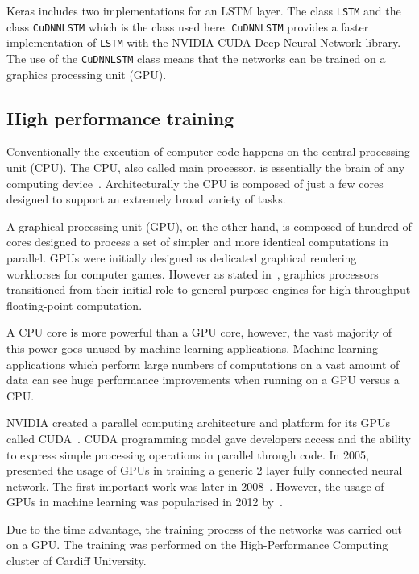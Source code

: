 Keras includes two implementations for an LSTM layer. The class
\texttt{LSTM} and the class \texttt{CuDNNLSTM} which is
the class used here. \texttt{CuDNNLSTM} provides a faster
implementation of \texttt{LSTM} with the NVIDIA CUDA Deep Neural Network
library. The use of the \texttt{CuDNNLSTM} class means that the networks
can be trained on a graphics processing unit (GPU).

\subsection{High performance training}

Conventionally the execution of computer code happens on the central processing
unit (CPU). The CPU, also called main processor, is essentially the brain of any
computing device~\cite{Berger2005}. Architecturally the CPU is composed of just
a few cores designed to support an extremely broad variety of tasks.

A graphical processing unit (GPU), on the other hand, is composed of hundred of
cores designed to process a set of simpler and more identical computations in
parallel. GPUs were initially designed as dedicated graphical rendering
workhorses for computer games. However as stated in~\cite{Catanzaro2008},
graphics processors transitioned from their initial role to general purpose
engines for high throughput floating-point computation.

A CPU core is more powerful than a GPU core, however, the vast majority of this
power goes unused by machine learning applications. Machine learning
applications which perform large numbers of computations on a vast amount of
data can see huge performance improvements when running on a GPU versus a CPU.

NVIDIA created a parallel computing architecture and platform for its GPUs
called CUDA~\cite{Harris2008}. CUDA programming model gave developers access and
the ability to express simple processing operations in parallel through code. In
2005, \cite{Steinkraus2005} presented the usage of GPUs in training a generic 2
layer fully connected neural network. The first important work was later in
2008~\cite{Raina2009}. However, the usage of GPUs in machine learning
was popularised in 2012 by~\cite{Krizhevsky2012}.

Due to the time advantage, the training process of the networks was carried out
on a GPU. The training was performed on the High-Performance Computing
cluster of Cardiff University.


